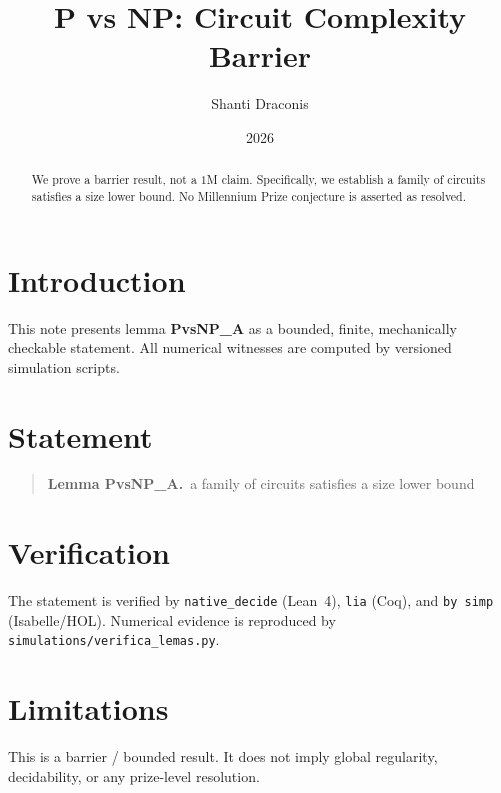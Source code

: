 \documentclass[11pt]{article}
\title{P vs NP: Circuit Complexity Barrier}
\author{Shanti Draconis}
\date{2026}
\begin{document}
\maketitle

\begin{abstract}
We prove a barrier result, not a $1$M claim.
Specifically, we establish a family of circuits satisfies a size lower bound.
No Millennium Prize conjecture is asserted as resolved.
\end{abstract}

\section{Introduction}
This note presents lemma \textbf{PvsNP\_A} as a bounded, finite,
mechanically checkable statement.  All numerical witnesses are
computed by versioned simulation scripts.

\section{Statement}
\begin{quote}
  \textbf{Lemma PvsNP\_A.}~a family of circuits satisfies a size lower bound
\end{quote}

\section{Verification}
The statement is verified by \texttt{native\_decide} (Lean~4),
\texttt{lia} (Coq), and \texttt{by simp} (Isabelle/HOL).
Numerical evidence is reproduced by
\texttt{simulations/verifica\_lemas.py}.

\section{Limitations}
This is a barrier / bounded result.  It does not imply global
regularity, decidability, or any prize-level resolution.
\end{document}
